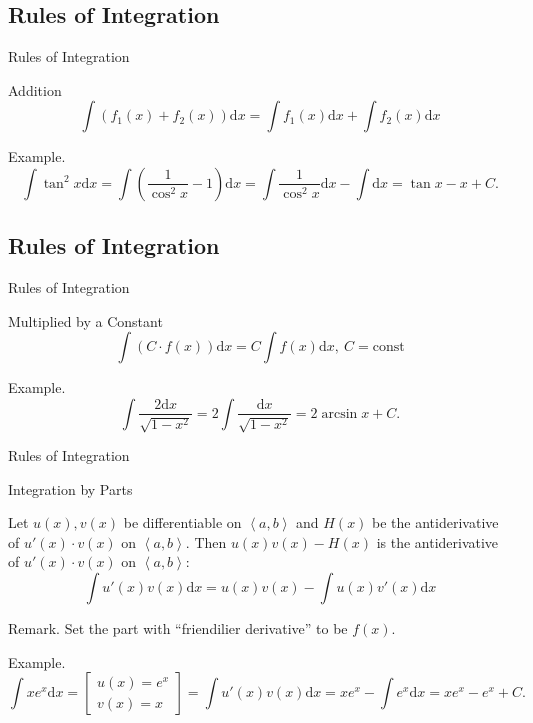 \documentclass[aspectratio=169, UTF8]{ctexbeamer}
\begin{document}
    \subsection{Rules of Integration}
    \begin{frame}[t]{Rules of Integration}
        \begin{block}{Addition}
            $$\int\left(f_{1}(x)+f_{2}(x)\right) \mathrm{d}x=\int f_{1}(x) \mathrm{d}x+\int f_{2}(x) \mathrm{d}x$$
        \end{block}
        \par \textcolor{yy}{Example.} $$\int \tan^2 x\mathrm{d}x = \int \left(\dfrac{1}{\cos^2 x} - 1\right)\mathrm{d}x = \int \dfrac{1}{\cos^2x}\mathrm{d}x - \int \mathrm{d}x = \tan x - x + C.$$
    \end{frame}

    \subsection{Rules of Integration}
    \begin{frame}[t]{Rules of Integration}
        \begin{block}{Multiplied by a Constant}
            $$\int (C\cdot f(x))\mathrm{d}x = C\int f(x)\mathrm{d}x,\ C = \text{const}$$
        \end{block}
        \par \textcolor{yy}{Example.} $$\int \dfrac{2\mathrm{d}x}{\sqrt{1-x^2}} = 2\int\dfrac{\mathrm{d}x}{\sqrt{1-x^2}} = 2\arcsin x + C.$$
    \end{frame}

    \begin{frame}[t]{Rules of Integration}
        \begin{block}{Integration by Parts}
            \par Let $u(x),v(x)$ be differentiable on $\left\langle a, b\right\rangle$ and $H(x)$ be the antiderivative of $u'(x)\cdot v(x)$ on $\left\langle a, b\right\rangle$. Then $u(x)v(x) - H(x)$ is the antiderivative of $u'(x)\cdot v(x)$ on $\left\langle a, b\right\rangle$: $$\int u'(x)v(x)\mathrm{d}x = u(x)v(x) - \int u(x)v'(x)\mathrm{d}x$$
        \end{block}
        \par \textcolor{yy}{Remark.} Set the part with ``friendilier derivative'' to be $f(x)$.
        \par \textcolor{yy}{Example.}
        \begin{equation*}
            \int xe^x\mathrm{d}x = \left[\begin{array}{l}
                u(x) = e^x \\ v(x) = x
            \end{array}\right] = \int u'(x)v(x) \mathrm{d}x = xe^x - \int e^x\mathrm{d}x = xe^x - e^x + C.
        \end{equation*}
    \end{frame}
\end{document}
